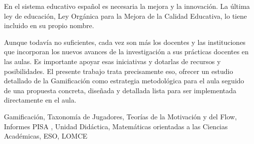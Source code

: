 

En el sistema educativo español es necesaria la mejora y la innovación. 
%
La última ley de educación, Ley Orgánica para la Mejora de la Calidad Educativa, lo tiene incluido en su propio nombre.

Aunque todavía no suficientes, cada vez son más los docentes y las instituciones que incorporan los nuevos avances de la investigación a sus prácticas docentes en las aulas.
%
Es importante apoyar esas iniciativas y dotarlas de recursos y posibilidades.
%
El presente trabajo trata precisamente eso, ofrecer un estudio detallado de la Gamificación como estrategia metodológica para el aula seguido de una propuesta concreta, diseñada y detallada lista para ser implementada directamente en el aula.


\begin{keywordsEs}
Gamificación, Taxonomía de Jugadores, Teorías de la Motivación y del Flow, Informes PISA , Unidad Didáctica, Matemáticas orientadas a las Ciencias Académicas, ESO, LOMCE
\end{keywordsEs}
